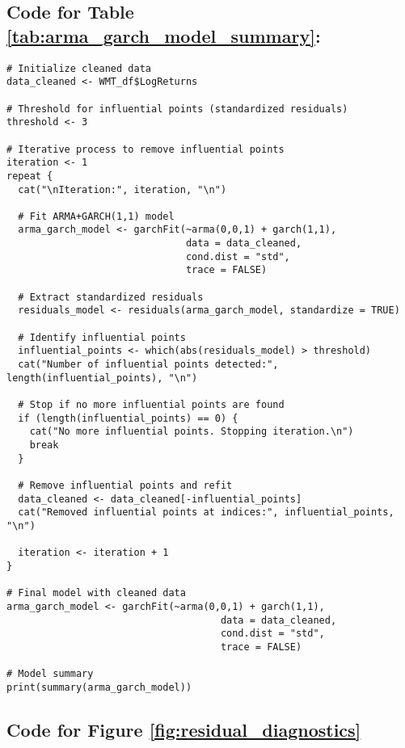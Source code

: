 \documentclass{article}
\newcommand{\1}{\mathbbm{1}}
\theoremstyle{definition}
\begin{document}
\subsection{Code for Table \ref{tab:arma_garch_model_summary}:}
\label{subsec:arma_garch_model_summary}

\begin{lstlisting}
# Initialize cleaned data
data_cleaned <- WMT_df$LogReturns

# Threshold for influential points (standardized residuals)
threshold <- 3

# Iterative process to remove influential points
iteration <- 1
repeat {
  cat("\nIteration:", iteration, "\n")
  
  # Fit ARMA+GARCH(1,1) model
  arma_garch_model <- garchFit(~arma(0,0,1) + garch(1,1), 
                               data = data_cleaned, 
                               cond.dist = "std", 
                               trace = FALSE)
  
  # Extract standardized residuals
  residuals_model <- residuals(arma_garch_model, standardize = TRUE)
  
  # Identify influential points
  influential_points <- which(abs(residuals_model) > threshold)
  cat("Number of influential points detected:", length(influential_points), "\n")
  
  # Stop if no more influential points are found
  if (length(influential_points) == 0) {
    cat("No more influential points. Stopping iteration.\n")
    break
  }
  
  # Remove influential points and refit
  data_cleaned <- data_cleaned[-influential_points]
  cat("Removed influential points at indices:", influential_points, "\n")
  
  iteration <- iteration + 1
}

# Final model with cleaned data
arma_garch_model <- garchFit(~arma(0,0,1) + garch(1,1), 
                                     data = data_cleaned, 
                                     cond.dist = "std", 
                                     trace = FALSE)

# Model summary
print(summary(arma_garch_model))
\end{lstlisting}


\subsection{Code for Figure \ref{fig:residual_diagnostics}}
\label{subsec:residual_diagnostics}
\end{document}
